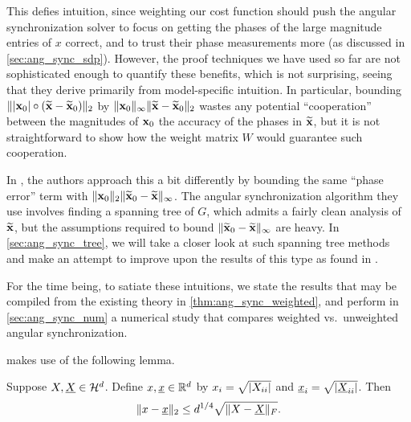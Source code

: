 This defies intuition, since weighting our cost function should push the angular synchronization solver to focus on getting the phases of the large magnitude entries of $x$ correct, and to trust their phase measurements more (as discussed in \cref{sec:ang_sync_sdp}).  However, the proof techniques we have used so far are not sophisticated enough to quantify these benefits, which is not surprising, seeing that they derive primarily from model-specific intuition.  In particular, bounding $\lVert|\mathbf{x}_0| \circ (\widetilde{\mathbf{x}} - \widetilde{\mathbf{x}}_0)\rVert_2$ by $\lVert\mathbf{x}_0\rVert_\infty \lVert\widetilde{\mathbf{x}} - \widetilde{\mathbf{x}}_0\rVert_2$ wastes any potential ``cooperation'' between the magnitudes of $\mathbf{x}_0$ the accuracy of the phases in $\widetilde{\mathbf{x}}$, but it is not straightforward to show how the weight matrix $W$ would guarantee such cooperation.

In \cite{IVW2015_FastPhase}, the authors approach this a bit differently by bounding the same ``phase error'' term with $\lVert\mathbf{x}_0\rVert_2 \lVert\widetilde{\mathbf{x}}_0 - \widetilde{\mathbf{x}}\rVert_\infty$.  The angular synchronization algorithm they use involves finding a spanning tree of $G$, which admits a fairly clean analysis of $\widetilde{\mathbf{x}}$, but the assumptions required to bound $\lVert\widetilde{\mathbf{x}}_0 - \widetilde{\mathbf{x}}\rVert_\infty$ are heavy.  In \cref{sec:ang_sync_tree}, we will take a closer look at such spanning tree methods and make an attempt to improve upon the results of this type as found in \cite{IVW2015_FastPhase}.

For the time being, to satiate these intuitions, we state the results that may be compiled from the existing theory in \cref{thm:ang_sync_weighted}, and perform in \cref{sec:ang_sync_num} a numerical study that compares weighted vs.~unweighted angular synchronization.

 makes use of the following lemma.

\begin{lemma}
  Suppose $X, \underline{X} \in \mathcal{H}^d$. Define $x, \underline{x} \in \mathbb{R}^d$ by $x_i = \sqrt{\lvert X_{ii}\rvert}$ and $\underline{x}_i = \sqrt{\lvert\underline{X}_{ii}\rvert}$.  Then \[\lVert x - \underline{x}\rVert_2 \le d^{1/ 4} \sqrt{\lVert X - \underline{X}\rVert_F}.\]
  \label{lem:diag_mag_diff}
\end{lemma}


